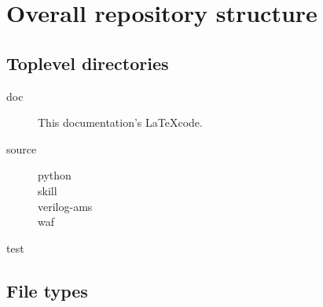 \chapter{Overall repository structure}
\section{Toplevel directories}
\begin{description}%
	\item[doc]
        This documentation's \LaTeX code.
    \item[source]
        \begin{description}
            \item[python]
            \item[skill]
            \item[verilog-ams]
            \item[waf]
        \end{description}
    \item[test]
\end{description}

\section{File types}
